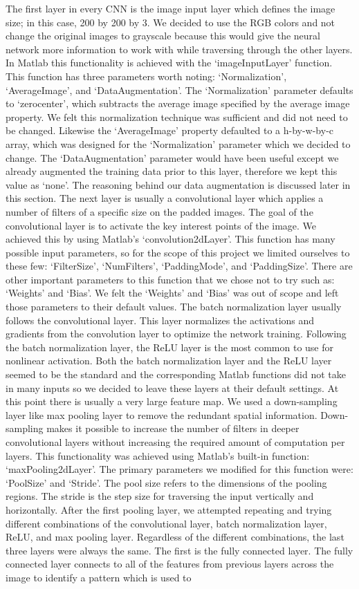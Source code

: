 \documentclass[conference]{IEEEtran}
\begin{document}
The first layer in every CNN is the image input layer which defines the image size; in this case, 200 by 200 by 3. We decided to use the RGB colors and not change the original images to grayscale because this would give the neural network more information to work with while traversing through the other layers. In Matlab this functionality is achieved with the ‘imageInputLayer’ function. This function has three parameters worth noting: ‘Normalization’, ‘AverageImage’, and ‘DataAugmentation’. The ‘Normalization’ parameter defaults to ‘zerocenter’, which subtracts the average image specified by the average image property. We felt this normalization technique was sufficient and did not need to be changed. Likewise the ‘AverageImage’ property defaulted to a h-by-w-by-c array, which was designed for the ‘Normalization’ parameter which we decided to change. The ‘DataAugmentation’ parameter would have been useful except we already augmented the training data prior to this layer, therefore we kept this value as ‘none’. The reasoning behind our data augmentation is discussed later in this section. The next layer is usually a convolutional layer which applies a number of filters of a specific size on the padded images. The goal of the convolutional layer is to activate the key interest points of the image. We achieved this by using Matlab’s ‘convolution2dLayer’. This function has many possible input parameters, so for the scope of this project we limited ourselves to these few: ‘FilterSize’, ‘NumFilters’, ‘PaddingMode’, and ‘PaddingSize’. There are other important parameters to this function that we chose not to try such as: ‘Weights’ and ‘Bias’. We felt the ‘Weights’ and ‘Bias’ was out of scope and left those parameters to their default values. The batch normalization layer usually follows the convolutional layer. This layer normalizes the activations and gradients from the convolution layer to optimize the network training. Following the batch normalization layer, the ReLU layer is the most common to use for nonlinear activation. Both the batch normalization layer and the ReLU layer seemed to be the standard and the corresponding Matlab functions did not take in many inputs so we decided to leave these layers at their default settings. At this point there is usually a very large feature map. We used a down-sampling layer like max pooling layer to remove the redundant spatial information. Down-sampling makes it possible to increase the number of filters in deeper convolutional layers without increasing the required amount of computation per layers. This functionality was achieved using Matlab’s built-in function: ‘maxPooling2dLayer’. The primary parameters we modified for this function were: ‘PoolSize’ and ‘Stride’. The pool size refers to the dimensions of the pooling regions. The stride is the step size for traversing the input vertically and horizontally. After the first pooling layer, we attempted repeating and trying different combinations of the convolutional layer, batch normalization layer, ReLU, and max pooling layer. Regardless of the different combinations, the last three layers were always the same. The first is the fully connected layer. The fully connected layer connects to all of the features from previous layers across the image to identify a pattern which is used to 
\end{document}
